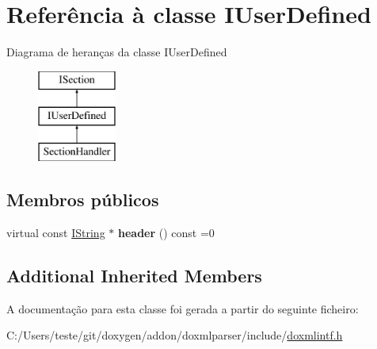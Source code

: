 \hypertarget{class_i_user_defined}{\section{Referência à classe I\-User\-Defined}
\label{class_i_user_defined}
}
Diagrama de heranças da classe I\-User\-Defined\begin{figure}[H]
\begin{center}
\leavevmode
\includegraphics[height=3.000000cm]{class_i_user_defined}
\end{center}
\end{figure}
\subsection*{Membros públicos}
\begin{DoxyCompactItemize}
\item 
\hypertarget{class_i_user_defined_ac11175970871c697eed34682d6e43d06}{virtual const \hyperlink{class_i_string}{I\-String} $\ast$ {\bfseries header} () const =0}\label{class_i_user_defined_ac11175970871c697eed34682d6e43d06}

\end{DoxyCompactItemize}
\subsection*{Additional Inherited Members}


A documentação para esta classe foi gerada a partir do seguinte ficheiro\-:\begin{DoxyCompactItemize}
\item 
C\-:/\-Users/teste/git/doxygen/addon/doxmlparser/include/\hyperlink{include_2doxmlintf_8h}{doxmlintf.\-h}\end{DoxyCompactItemize}
